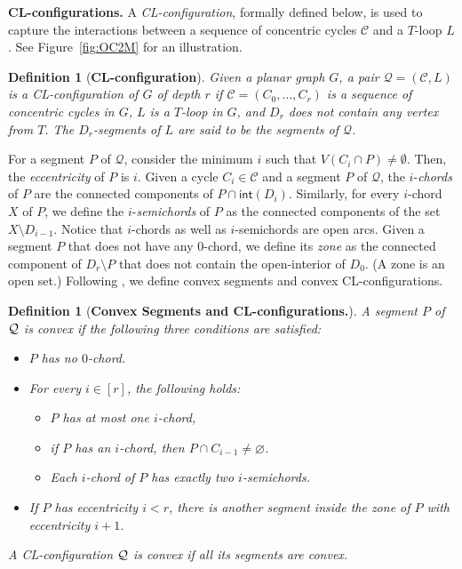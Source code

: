 \documentclass{article}
\newtheorem{definition}[theorem]{Definition}
\numberwithin{claimcounter}{lemma}
\begin{document}
\medskip
\noindent\textbf{CL-configurations.} A \textit{CL-configuration}, formally defined below, is used to capture the interactions between a sequence of concentric cycles $\mathcal{C}$ and a $T$-loop $L$. See Figure~\ref{fig:OC2M} for an illustration. 

\begin{definition}[{\bf CL-configuration}]\label{D:CL}
Given a planar graph $G$, a pair $\mathcal{Q} = (\mathcal{C},L)$ is a {\em CL-configuration} of $G$ of \textit{depth} $r$ if $\mathcal{C}= (C_0,\ldots,C_r)$ is a sequence of concentric cycles in $G$, $L$ is a $T$-loop in $G$, and $D_r$ does not contain any vertex from $T$. The $D_r$-segments of $L$ are said to be the \textit{segments} of $\mathcal{Q}$. 
\end{definition}

For a segment $P$ of $\mathcal{Q}$, consider the minimum $i$ such that $V(C_i\cap P) \neq \emptyset$. Then, the \textit{eccentricity} of $P$ is $i$. 
Given a cycle $C_i\in \mathcal{C}$ and a segment $P$ of $\mathcal{Q}$,  the $i$-\textit{chords}  of $P$ are the connected components of $P\cap \mathsf{int}(D_i)$. Similarly, for every $i$-chord $X$ of $P$, we define the $i$-\textit{semichords} of $P$ as the connected components of the set $X\setminus D_{i-1}$. Notice that $i$-chords as well as $i$-semichords are open arcs. Given a segment $P$ that does not have any $0$-chord, we define its \textit{zone} as the connected component of $D_r\setminus P$ that does not contain the open-interior of $D_0$. (A zone is an open set.) 
Following \cite{JCTB}, we define convex segments and convex CL-configurations.
\begin{definition}[{\bf Convex Segments and CL-configurations.}]\label{D:CLConvex}
    A segment $P$ of  ${\cal Q}$ is {\em convex}
if the following three conditions are satisfied:
\begin{itemize}
\item[(i)] $P$ has no $0$-chord. 
\item[(ii)] For every $i\in [r]$,  the following holds:
\begin{itemize}
\item[a.] $P$ has at most one $i$-chord, 
\item[b.] if  $P$ has  an  $i$-chord, then $P\cap C_{i-1}\neq\varnothing$.
\item[c.] Each $i$-chord of $P$ has exactly two $i$-semichords.
\end{itemize}
\item[(iii)] If $P$ has eccentricity $i<r$, there 
is another segment inside the   zone of $P$
with eccentricity $i+1$.
\end{itemize}
A CL-configuration ${\cal Q}$ is \emph{convex}  if all its segments are convex.
\end{definition}
\end{document}
